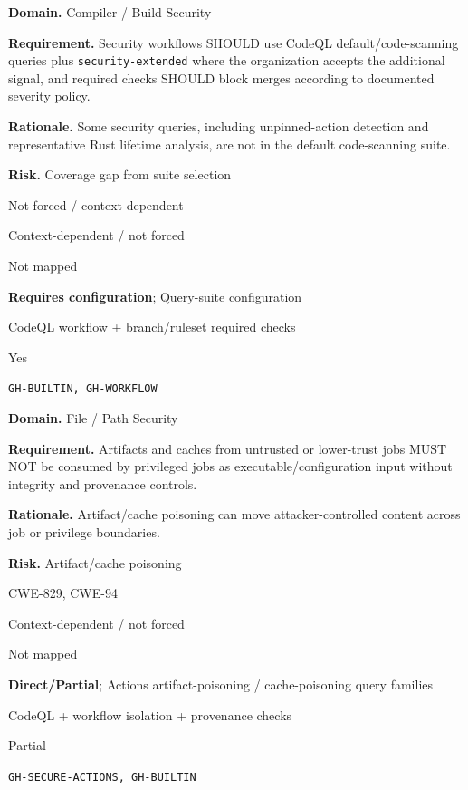 \documentclass[10pt,letterpaper]{article}
\newcommand{\code}[1]{\texttt{\small #1}}
\newcommand{\prioritybadge}[2]{\tcbox[on line,boxrule=0pt,arc=1.2mm,boxsep=0.7mm,left=1mm,right=1mm,top=0.4mm,bottom=0.4mm,colback=#2!12,coltext=#2]{\scriptsize\bfseries #1}}
\begin{document}
\begin{rulebox}[title={\texttt{SCS-ACTIONS-BUILD-001} \hfill \prioritybadge{High Priority}{High}}]
\textbf{Domain.} Compiler / Build Security

\textbf{Requirement.} Security workflows SHOULD use CodeQL default/code-scanning queries plus \code{security-extended} where the organization accepts the additional signal, and required checks SHOULD block merges according to documented severity policy.

\textbf{Rationale.} Some security queries, including unpinned-action detection and representative Rust lifetime analysis, are not in the default code-scanning suite.

\textbf{Risk.} Coverage gap from suite selection

\begin{description}[leftmargin=2.65cm,labelwidth=2.3cm,style=nextline,itemsep=1pt,topsep=3pt]
  \item[CWE] Not forced / context-dependent
  \item[OWASP] Context-dependent / not forced
  \item[CERT] Not mapped
  \item[CodeQL] \textbf{Requires configuration}; Query-suite configuration
  \item[Enforcement] CodeQL workflow + branch/ruleset required checks
  \item[Automation] Yes
  \item[Sources] \texttt{GH-BUILTIN, GH-WORKFLOW}
\end{description}
\end{rulebox}

\begin{rulebox}[title={\texttt{SCS-ACTIONS-FILE-001} \hfill \prioritybadge{High Priority}{High}}]
\textbf{Domain.} File / Path Security

\textbf{Requirement.} Artifacts and caches from untrusted or lower-trust jobs MUST NOT be consumed by privileged jobs as executable/configuration input without integrity and provenance controls.

\textbf{Rationale.} Artifact/cache poisoning can move attacker-controlled content across job or privilege boundaries.

\textbf{Risk.} Artifact/cache poisoning

\begin{description}[leftmargin=2.65cm,labelwidth=2.3cm,style=nextline,itemsep=1pt,topsep=3pt]
  \item[CWE] CWE-829, CWE-94
  \item[OWASP] Context-dependent / not forced
  \item[CERT] Not mapped
  \item[CodeQL] \textbf{Direct/Partial}; Actions artifact-poisoning / cache-poisoning query families
  \item[Enforcement] CodeQL + workflow isolation + provenance checks
  \item[Automation] Partial
  \item[Sources] \texttt{GH-SECURE-ACTIONS, GH-BUILTIN}
\end{description}
\end{rulebox}
\end{document}
